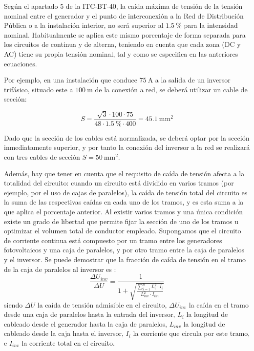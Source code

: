 Según el apartado 5 de la ITC-BT-40, la caída máxima de tensión de la
tensión nominal entre el generador y el punto de interconexión a la
Red de Distribución Pública o a la instalación interior, no será
superior al $\SI{1.5}{\percent}$ para la intensidad nominal.
Habitualmente se aplica este mismo porcentaje de forma separada para
los circuitos de continua y de alterna, teniendo en cuenta que cada
zona (DC y AC) tiene su propia tensión nominal, tal y como se
especifica en las anteriores ecuaciones.

Por ejemplo, en una instalación que conduce $\SI{75}{\ampere}$ a la
salida de un inversor trifásico, situado este a $\SI{100}{\meter}$ de
la conexión a red, se deberá utilizar un cable de sección:

\[
  S=\frac{\sqrt{3}\cdot100\cdot75}{48\cdot \SI{1.5}{\percent}\cdot400}=\SI{45.1}{\milli\meter\squared}
\]

Dado que la sección de los cables está normalizada, se deberá optar
por la sección inmediatamente superior, y por tanto la conexión del
inversor a la red se realizará con tres cables de sección
$S=\SI{50}{\milli\meter\squared}$.

Además, hay que tener en cuenta que el requisito de caída de tensión
afecta a la totalidad del circuito: cuando un circuito está dividido
en varios tramos (por ejemplo, por el uso de cajas de paralelos), la
caída de tensión total del circuito es la suma de las respectivas
caídas en cada uno de los tramos, y es esta suma a la que aplica el
porcentaje anterior. Al existir varios tramos y una única condición
existe un grado de libertad que permite fijar la sección de uno de los
tramos u optimizar el volumen total de conductor empleado. Supongamos
que el circuito de corriente continua está compuesto por un tramo
entre los generadores fotovoltaicos y una caja de paralelos, y por otro
tramo entre la caja de paralelos y el inversor. Se puede demostrar que
la fracción de caída de tensión en el tramo de la caja de paralelos al
inversor es \cite{Perpinan2012b}:
\begin{equation}
  \frac{\Delta U_{inv}}{\Delta U}= \frac{1}{1+\sqrt{\frac{\sum_{i=1}^nL_{i}^2
        \cdot I_{i}}{L_{inv}^2 \cdot I_{inv}}}}
\end{equation}
siendo $\Delta U$ la caída de tensión admisible en el circuito,
$\Delta U_{inv}$ la caída en el tramo desde una caja de paralelos
hasta la entrada del inversor, $L_i$ la longitud de cableado desde el
generador hasta la caja de paralelos, $L_{inv}$ la longitud de
cableado desde la caja hasta el inversor, $I_i$ la corriente que
circula por este tramo, e $I_{inv}$ la corriente total en el circuito.

